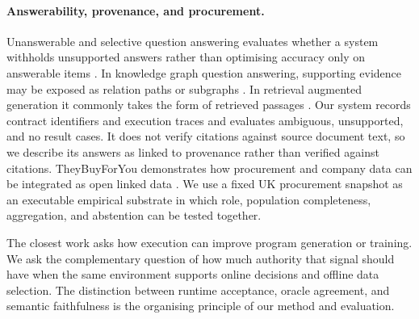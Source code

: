 \paragraph{Answerability, provenance, and procurement.}
Unanswerable and selective question answering evaluates whether a system withholds unsupported
answers rather than optimising accuracy only on answerable items
\citep{rajpurkar2018know,kamath2020selective}.  In knowledge graph question answering, supporting
evidence may be exposed as relation paths or subgraphs \citep{luo2024rog}.  In retrieval augmented
generation it commonly takes the form of retrieved passages \citep{lewis2020rag}.  Our system
records contract identifiers and execution traces and
evaluates ambiguous, unsupported, and no result cases.  It does not verify citations against source
document text, so we describe its answers as linked to provenance rather than verified against
citations.
TheyBuyForYou demonstrates how procurement and company data can be integrated as open linked data
\citep{soylu2022theybuyforyou}.  We use a fixed UK procurement snapshot as an executable empirical
substrate in which role, population completeness, aggregation, and abstention can be tested
together.

The closest work asks how execution can improve program generation or training.  We ask the
complementary question of how much authority that signal should have when the same environment
supports online decisions and offline data selection.  The distinction between runtime acceptance,
oracle agreement, and semantic faithfulness is the organising principle of our method and
evaluation.
